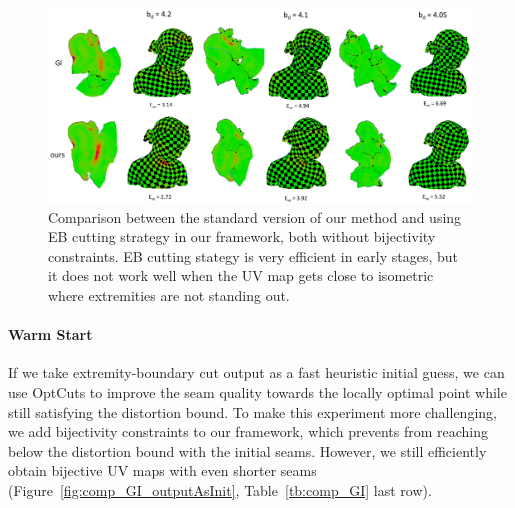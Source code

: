 \begin{figure}[!h]
\centering
\includegraphics[width=0.8\linewidth]{fig/comp_GI.png}
\caption{Comparison between the standard version of our method and using EB cutting strategy in our framework, both without bijectivity constraints. EB cutting stategy is very efficient in early stages, but it does not work well when the UV map gets close to isometric where extremities are not standing out.}
\label{fig:comp_GI}
\end{figure}

\paragraph{Warm Start}
If we take extremity-boundary cut output as a fast heuristic initial guess, we can use OptCuts to improve the seam quality towards the locally optimal point while still satisfying the distortion bound. To make this experiment more challenging, we add bijectivity constraints to our framework, which prevents from reaching below the distortion bound with the initial seams. However, we still efficiently obtain bijective UV maps with even shorter seams (Figure~\ref{fig:comp_GI_outputAsInit}, Table~\ref{tb:comp_GI} last row).

